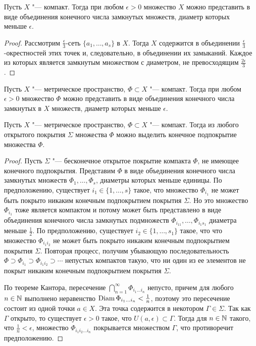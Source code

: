 \begin{proposition}
    Пусть $X$ "--- компакт. Тогда при любом $\epsilon > 0$ множество $X$ можно представить в виде объединения конечного числа замкнутых множеств, диаметр которых меньше $\epsilon$.
\end{proposition}

\begin{proof}
    Рассмотрим $\frac \epsilon 3$-сеть $\lbrace a_1,\ldots, a_s\rbrace$ в $X$. Тогда $X$ содержится в объединении $\frac \epsilon 3$-окрестностей этих точек и, следовательно, в объединении их замыканий. Каждое из которых является замкнутым множеством с диаметром, не превосходящим $\frac{2\epsilon}{3}$.
\end{proof}

\begin{corollary}
    Пусть $X$ "--- метрическое пространство, $\Phi \subset X$ "--- компакт. Тогда при любом $\epsilon > 0$ множество $\Phi$ можно представить в виде объединения конечного числа замкнутых в $X$ множеств, диаметр которых меньше $\epsilon$.
\end{corollary}

\begin{theorem}
    Пусть $X$ "--- метрическое пространство, $\Phi \subset X$ "--- компакт. Тогда из любого открытого покрытия $\Sigma$ множества $\Phi$ можно выделить конечное подпокрытие множества $\Phi$.
\end{theorem}

\begin{proof}
    Пусть $\Sigma$ "--- бесконечное открытое покрытие компакта $\Phi$, не имеющее конечного подпокрытия. Представим $\Phi$ в виде объединения конечного числа замкнутых множеств $\Phi_1, \ldots, \Phi_s$, диаметры которых меньше единицы. По предположению, существует $i_1 \in \{1, \dotsc, s\}$ такое, что множество $\Phi_{i_1}$ не может быть покрыто никаким конечным подпокрытием покрытия $\Sigma$. Но это множество $\Phi_{i_1}$ тоже является компактом и потому может быть представлено в виде объединения конечного числа замкнутых подмножеств $\Phi_{i_11}, \ldots, \Phi_{i_1s_1}$ диаметра меньше $\frac 12$. По предположению, существует $i_2 \in \{1, \dotsc, s_1\}$ такое, что что множество $\Phi_{i_1i_2}$ не может быть покрыто никаким конечным подпокрытием покрытия $\Sigma$. Повторая процесс, получим убывающую последовательность $\Phi\supset \Phi_{i_1}\supset\Phi_{i_1i_2}\supset \dotsb$ непустых компактов такую, что ни один из ее элементов не покрыт никаким конечным подпокрытием покрытия $\Sigma$.
    
    По теореме Кантора, пересечение $\bigcap_{n = 1}^\infty \Phi_{i_1\ldots i_n}$ непусто, причем для любого $n \in \mathbb{N}$ выполнено неравенство $\operatorname{Diam} \Phi_{i_1\ldots i_n} < \frac 1n$, поэтому это пересечение состоит из одной точки $a \in X$. Эта точка содержится в некотором $\Gamma \in \Sigma$. Так как $\Gamma$ открыто, то существует $\epsilon > 0$ такое, что $U(a, \epsilon) \subset \Gamma$. Тогда для $n \in \mathbb{N}$ такого, что $\frac 1n < \epsilon$, множество $\Phi_{i_1i_2\ldots i_n}$ покрывается множеством $\Gamma$, что противоречит предположению.
\end{proof}


